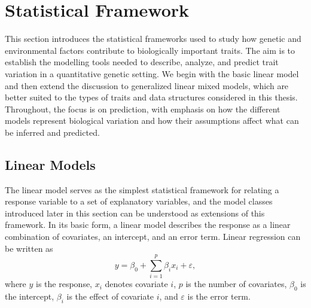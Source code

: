 
\section{Statistical Framework}

This section introduces the statistical frameworks used to study how genetic and environmental factors contribute to biologically important traits. The aim is to establish the modelling tools needed to describe, analyze, and predict trait variation in a quantitative genetic setting. We begin with the basic linear model and then extend the discussion to generalized linear mixed models, which are better suited to the types of traits and data structures considered in this thesis. Throughout, the focus is on prediction, with emphasis on how the different models represent biological variation and how their assumptions affect what can be inferred and predicted.   

\subsection{Linear Models}

The linear model serves as the simplest statistical framework for relating a response variable to a set of explanatory variables, and the model classes introduced later in this section can be understood as extensions of this framework. In its basic form, a linear model describes the response as a linear combination of covariates, an intercept, and an error term. Linear regression can be written as
%
\begin{equation}
y = \beta_0 + \sum_{i=1}^p \beta_i x_i + \varepsilon,
\end{equation}
%
where $y$ is the response, $x_i$ denotes covariate $i$, $p$ is the number of covariates, $\beta_0$ is the intercept, $\beta_i$ is the effect of covariate $i$, and $\varepsilon$ is the error term.


